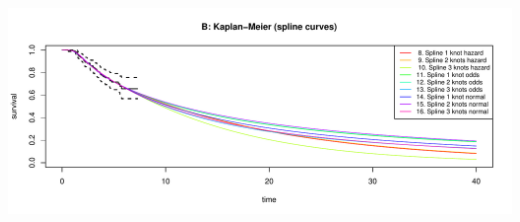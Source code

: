\documentclass[]{article}
\begin{document}
\begin{flushleft}\includegraphics[height=0.29\textheight]{Images/validate_extrapolation1-2} \end{flushleft}

\begin{table}


\end{table}
\end{document}
